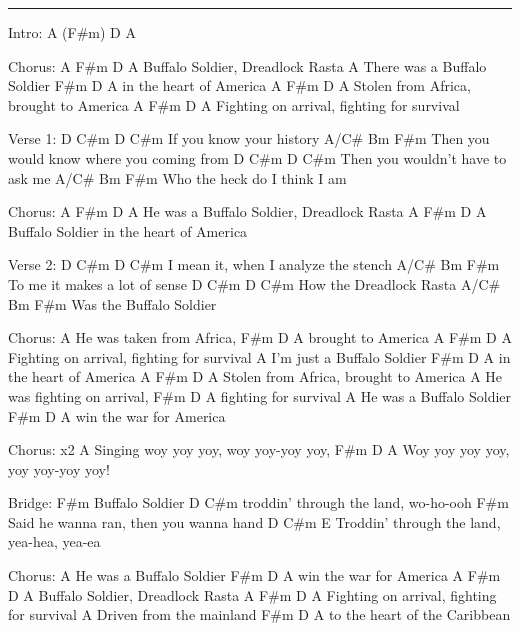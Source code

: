 \noindent\rule{\columnwidth}{1pt}

\begin{multicols}{2}
\begin{lstsong}
Intro: A  (F#m)  D  A

Chorus:
A                F#m       D         A
Buffalo Soldier, Dreadlock Rasta
            A
There was a Buffalo Soldier 
       F#m       D       A
in the heart of America
A                   F#m         D       A
Stolen from Africa, brought to America
A                    F#m             D      A
Fighting on arrival, fighting for survival

Verse 1:
D      C#m       D       C#m
If you know your history
A/C#           Bm             F#m
Then you would know where you coming from
D        C#m              D      C#m
Then you wouldn't have to ask me
A/C#    Bm        F#m
Who the heck do I think I am

Chorus:
         A                F#m       D      A
He was a Buffalo Soldier, Dreadlock Rasta                
A                      F#m       D        A
Buffalo Soldier in the heart of America

Verse 2:
           D      C#m  D             C#m
I mean it, when I analyze the stench
A/C#     Bm      F#m
To me it makes a lot of sense
D       C#m       D     C#m
How the Dreadlock Rasta 
A/C#     Bm      F#m
Was the Buffalo Soldier



Chorus:
       A
He was taken from Africa, 
F#m         D       A
brought to America
A                    F#m             D      A
Fighting on arrival, fighting for survival
           A
I'm just a Buffalo Soldier
       F#m       D       A
in the heart of America
A                   F#m         D       A
Stolen from Africa, brought to America
       A
He was fighting on arrival,
F#m              D      A
fighting for survival
         A
He was a Buffalo Soldier
        F#m      D       A
win the war for America

Chorus: x2
        A                                  
Singing woy yoy yoy, woy yoy-yoy yoy, 
F#m                  D       A
Woy yoy yoy yoy, yoy yoy-yoy yoy! 

Bridge:
F#m
Buffalo Soldier
                     D           C#m
troddin' through the land, wo-ho-ooh
              F#m          
Said he wanna ran, then you wanna hand
                     D                C#m  E
Troddin' through the land, yea-hea, yea-ea

Chorus:
         A
He was a Buffalo Soldier
        F#m      D       A
win the war for America
A                F#m       D       A
Buffalo Soldier, Dreadlock Rasta
A                    F#m             D      A
Fighting on arrival, fighting for survival
A
Driven from the mainland
       F#m          D      A
to the heart of the Caribbean
\end{lstsong}
\end{multicols}
\newpage

